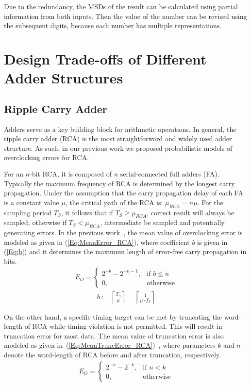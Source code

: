 \documentclass[10pt, conference, compsocconf]{IEEEtran}
\begin{document}
Due to the redundancy, the MSDs of the result can be calculated using partial information from both inputs. Then the value of the number can be revised using the subsequent digits, because each number has multiple representations.

\section{Design Trade-offs of Different Adder Structures}\label{sec:diff_adder}
\subsection{Ripple Carry Adder}
Adders serve as a key building block for arithmetic operations. In general, the ripple carry adder (RCA) is the most straightforward and widely used adder structure. As such, in our previous work we proposed probabilistic models of overclocking errors for RCA.

For an $n$-bit RCA, it is composed of $n$ serial-connected full adders (FA). Typically the maximum frequency of RCA is determined by the longest carry propagation. Under the assumption that the carry propagation delay of each FA is a constant value $\mu$, the critical path of the RCA is: $\mu_{RCA}=n\mu$. For the sampling period $T_S$, it follows that if $T_S\geqslant\mu_{RCA}$, correct result will always be sampled; otherwise if $T_S<\mu_{RCA}$, intermediate be sampled and potentially generating errors. In the previous work~\cite{SKfccm13}, the mean value of overclocking error is modeled as given in (\ref{Eq:MeanError_RCA}), where coefficient $b$ is given in (\ref{Eq:b}) and it determines the maximum length of error-free carry propagation in bits.
%
\begin{eqnarray}\label{Eq:MeanError_RCA}
    E_O=\left\{
        \begin{matrix}
            2^{-b}-2^{-n-1}, & \textrm{if $b\leq n$}\\
            0, & \textrm{otherwise}
        \end{matrix}
        \right.
\end{eqnarray}
%
\begin{eqnarray}\label{Eq:b}
    b:=\left\lceil \frac{T_S}{\mu} \right\rceil=\left\lceil \frac{1}{\mu\cdot f_S}\right\rceil
\end{eqnarray}

On the other hand, a specific timing target can be met by truncating the word-length of RCA while timing violation is not permitted. This will result in truncation error for most data.  The mean value of truncation error is also modeled as given in~(\ref{Eq:MeanTruncError_RCA})~\cite{SKfccm13}, where parameters $k$ and $n$ denote the word-length of RCA before and after truncation, respectively. 
%
\begin{eqnarray}\label{Eq:MeanTruncError_RCA}
    E_O=\left\{
        \begin{matrix}
            2^{-n}-2^{-k}, & \textrm{if $n<k$}\\
            0, & \textrm{otherwise}
        \end{matrix}
        \right.
\end{eqnarray}
\end{document}
